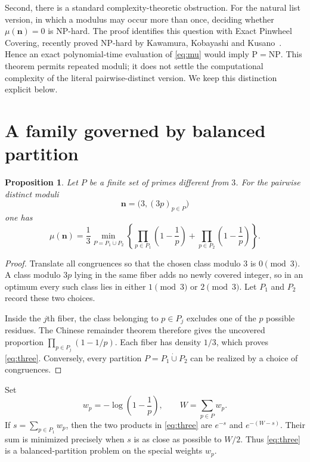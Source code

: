 \documentclass[a4paper,11pt]{article}
\newtheorem{proposition}[question]{Proposition}
\begin{document}
Second, there is a standard complexity-theoretic obstruction.  For the
natural list version, in which a modulus may occur more than once, deciding
whether $\mu(\mathbf n)=0$ is NP-hard.  The proof identifies this question with
Exact Pinwheel Covering, recently proved NP-hard by Kawamura, Kobayashi and
Kusano~\cite{KKK25}.  Hence an exact polynomial-time evaluation of
\eqref{eq:mu} would imply $\mathrm P=\mathrm{NP}$.  This theorem permits
repeated moduli; it does not settle the computational complexity of the
literal pairwise-distinct version.  We keep this distinction explicit below.

\section{A family governed by balanced partition}

\begin{proposition}\label{prop:three}
Let $P$ be a finite set of primes different from $3$.  For the pairwise
distinct moduli
\[
 \mathbf n=\bigl(3,(3p)_{p\in P}\bigr)
\]
one has
\begin{equation}\label{eq:three}
 \mu(\mathbf n)=\frac13
 \min_{P=P_1\mathbin{\dot\cup}P_2}
 \left\{
   \prod_{p\in P_1}\left(1-\frac1p\right)
   +
   \prod_{p\in P_2}\left(1-\frac1p\right)
 \right\}.
\end{equation}
\end{proposition}

\begin{proof}
Translate all congruences so that the chosen class modulo $3$ is
$0\pmod 3$.  A class modulo $3p$ lying in the same fiber adds no newly
covered integer, so in an optimum every such class lies in either
$1\pmod 3$ or $2\pmod 3$.  Let $P_1$ and $P_2$ record these two choices.

Inside the $j$th fiber, the class belonging to $p\in P_j$ excludes one of the
$p$ possible residues.  The Chinese remainder theorem therefore gives the
uncovered proportion
\(
 \prod_{p\in P_j}(1-1/p).
\)
Each fiber has density $1/3$, which proves \eqref{eq:three}.  Conversely,
every partition $P=P_1\mathbin{\dot\cup}P_2$ can be realized by a choice of
congruences.
\end{proof}

Set
\[
 w_p=-\log\left(1-\frac1p\right),
 \qquad W=\sum_{p\in P}w_p.
\]
If $s=\sum_{p\in P_1}w_p$, then the two products in \eqref{eq:three} are
$e^{-s}$ and $e^{-(W-s)}$.  Their sum is minimized precisely when $s$ is as
close as possible to $W/2$.  Thus \eqref{eq:three} is a balanced-partition
problem on the special weights $w_p$.
\end{document}

